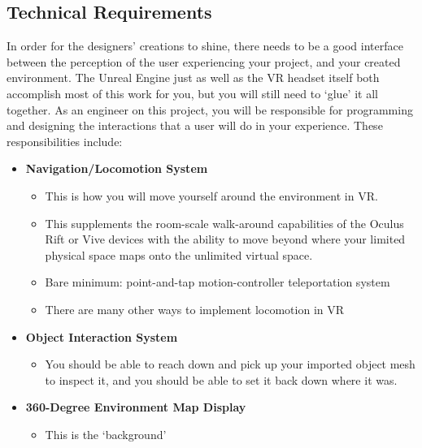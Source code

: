 \documentclass[12pt]{article}
\begin{document}
\subsection{Technical Requirements}

In order for the designers’ creations to shine, there needs to be a good interface between the perception of the user experiencing your project, and your created environment.  The Unreal Engine just as well as the VR headset itself both accomplish most of this work for you, but you will still need to ‘glue’ it all together.  As an engineer on this project, you will be responsible for programming and designing the interactions that a user will do in your experience.  These responsibilities include:

\begin{itemize}

	\item \textbf{Navigation/Locomotion System}
	\begin{itemize}
	
		\item This is how you will move yourself around the environment in VR.
		\item This supplements the room-scale walk-around capabilities of the Oculus Rift or Vive devices with the ability to move beyond where your limited physical space maps onto the unlimited virtual space.
		\item Bare minimum: point-and-tap motion-controller teleportation system
		\item There are many other ways to implement locomotion in VR
	\end{itemize}
	\item \textbf{Object Interaction System}
	\begin{itemize}
	
		\item You should be able to reach down and pick up your imported object mesh to inspect it, and you should be able to set it back down where it was.
		
	\end{itemize}
	
	\item \textbf{360-Degree Environment Map Display}
	\begin{itemize}
	
		\item This is the ‘background’ 
				
	\end{itemize}
	
\end{itemize}
\end{document}
